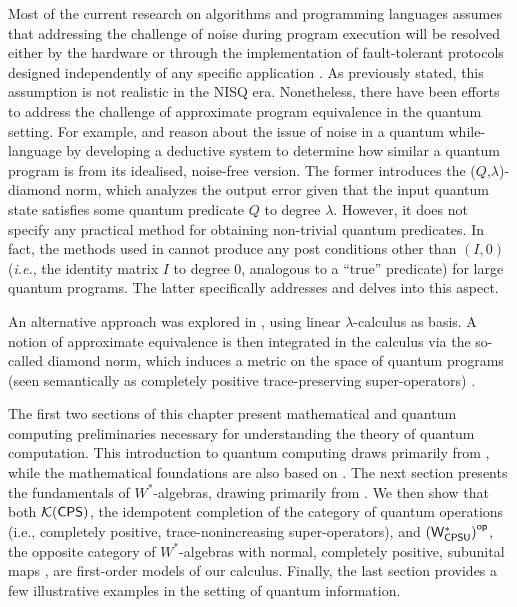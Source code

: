 Most of the current research on algorithms and programming languages assumes that addressing the challenge of noise during program execution will be resolved either by the hardware or through the implementation of fault-tolerant protocols designed independently of any specific application \cite{chong2017programming}. As previously stated, this assumption is not realistic in the NISQ era. Nonetheless, there have been efforts to address the challenge of approximate program equivalence in the quantum setting. For example, \cite{hung2019quantitative} and \cite{tao2021gleipnir} reason about the issue of noise in a quantum while-language by developing a deductive system to determine how similar a quantum program is from its idealised, noise-free version. The former introduces the ($Q$,$\lambda$)-diamond norm, which analyzes the output error given that the input quantum state satisfies some quantum predicate $Q$ to degree $\lambda$. However, it does not specify any practical method for obtaining non-trivial quantum predicates. In fact, the methods used in \cite{hung2019quantitative} cannot produce any post conditions other than $(I,0)$ (\textit{i.e.}, the identity matrix $I$ to degree 0, analogous to a ``true” predicate) for large quantum programs. The latter specifically addresses and delves into this aspect.  

An alternative approach was explored in \cite{dahlqvist2023syntactic}, using linear $\lambda$-calculus as basis. A notion of approximate equivalence is then
integrated in the calculus via the so-called diamond norm, which induces a metric on the space of quantum programs (seen semantically as completely positive trace-preserving super-operators) \cite{watrous2018theory}. 


\vspace{20pt}

The first two sections of this chapter present  mathematical and quantum computing preliminaries necessary for understanding the theory of quantum computation. This introduction to quantum computing draws primarily from \cite{nielsen2010quantum,watrous2018theory}, while the mathematical foundations are also based on \cite{heinosaariMathematicalLanguageQuantum2011,conwayCourseFunctionalAnalysis2007,conwayCourseOperatorTheory2000}.
The next section presents the fundamentals of \( W^* \)-algebras, drawing primarily from \cite{sakaiCAlgebrasWAlgebras1998,takesakiTheoryOperatorAlgebras1979,westerbaanCategoryNeumannAlgebras2019}.
We then show that both \( \mathcal{K}{(\mathsf{CPS})} \), the idempotent completion of the category of quantum operations 
 (i.e., completely positive, trace-nonincreasing super-operators), and
$\left(\mathsf{W^*_{CPSU}}\right)^{\mathsf{op}}$, the opposite category of \( W^* \)-algebras with normal, completely positive, subunital maps \cite{westerbaanCategoryNeumannAlgebras2019,choSemanticsQuantumProgramming2016}, are first-order models of our calculus.
Finally, the last section provides a few illustrative examples in the setting of quantum information.



